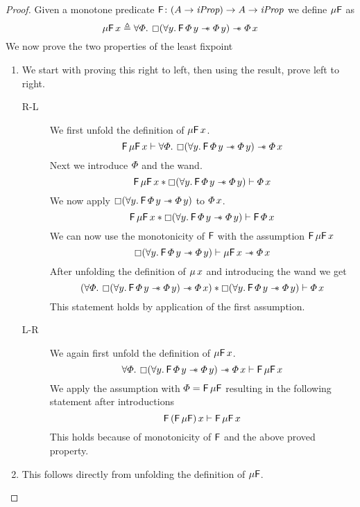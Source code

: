 \documentclass[thesis.tex]{subfiles}
\begin{document}
\begin{proof}
    Given a monotone predicate $\textsf{\upshape F}\colon (A \to \textit{iProp}) \to  A \to \textit{iProp}$ we define $\mu\textsf{\upshape F}$ as
    \[ \lfp\hopred\, \var \eqdef \All \pred. \always(\All \varB. \hopred\, \pred\, \varB \wand \pred\, \varB) \wand \pred \, \var \]
    We now prove the two properties of the least fixpoint
    \begin{enumerate}
        \item We start with proving this right to left, then using the result, prove left to right.
              \begin{description}
                  \item[R-L] We first unfold the definition of $\mu\textsf{\upshape F}\, x$.
                      \[ \hopred\, \lfp\hopred\, \var \proves \All \pred. \always(\All \varB. \hopred\, \pred\, \varB \wand \pred\, \varB) \wand \pred \, \var \]
                      Next we introduce $\varPhi$ and the wand.
                      \[ \hopred\, \lfp\hopred\, \var * \always(\All \varB. \hopred\, \pred\, \varB \wand \pred\, \varB) \proves \pred \, \var \]
                      We now apply $\always(\All \varB. \hopred\, \pred\, \varB \wand \pred\, \varB)$ to $\varPhi\, x$.
                      \[ \hopred\, \lfp\hopred\, \var * \always(\All \varB. \hopred\, \pred\, \varB \wand \pred\, \varB) \proves \hopred\, \pred\, \var \]
                      We can now use the monotonicity of $\textsf{\upshape F}$ with the assumption $\textsf{\upshape F}\, \mu\textsf{\upshape F}\, x$
                      \[ \always(\All \varB. \hopred\, \pred\, \varB \wand \pred\, \varB) \proves \lfp\hopred\, \var \wand \pred\, \var \]
                      After unfolding the definition of $\mu\, x$ and introducing the wand we get
                      \[ (\All \pred. \always(\All \varB. \hopred\, \pred\, \varB \wand \pred\, \varB) \wand \pred \, \var) * \always(\All \varB. \hopred\, \pred\, \varB \wand \pred\, \varB) \proves \pred\, \var \]
                      This statement holds by application of the first assumption.
                  \item[L-R] We again first unfold the definition of $\mu\textsf{\upshape F}\, x$.
                      \[ \All \pred. \always(\All \varB. \hopred\, \pred\, \varB \wand \pred\, \varB) \wand \pred \, \var \proves \hopred\, \lfp\hopred\, \var \]
                      We apply the assumption with $\varPhi = \textsf{\upshape F}\, \mu\textsf{\upshape F}$ resulting in the following statement after introductions
                      \[ \textsf{\upshape F}\, (\textsf{\upshape F}\, \mu\textsf{\upshape F})\, x \vdash \textsf{\upshape F}\, \mu\textsf{\upshape F}\, x \]
                      This holds because of monotonicity of $\textsf{\upshape F}$ and the above proved property.
              \end{description}
        \item This follows directly from unfolding the definition of $\mu\textsf{\upshape F}$.
    \end{enumerate}
\end{proof}
\end{document}
